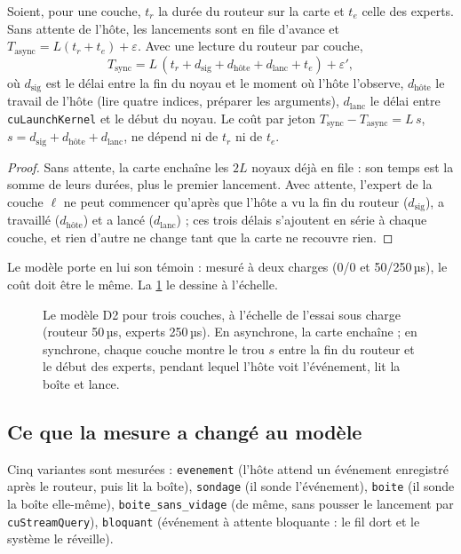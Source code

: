 \begin{proposition}\label{prop:t2c-d2}
Soient, pour une couche, $t_r$ la durée du routeur sur la carte et $t_e$ celle des experts. Sans attente de l'hôte, les lancements sont en file d'avance et $T_{\mathrm{async}} = L(t_r + t_e) + \varepsilon$. Avec une lecture du routeur par couche,
\[
T_{\mathrm{sync}} = L\,(t_r + d_{\mathrm{sig}} + d_{\text{hôte}} + d_{\mathrm{lanc}} + t_e) + \varepsilon',
\]
où $d_{\mathrm{sig}}$ est le délai entre la fin du noyau et le moment où l'hôte l'observe, $d_{\text{hôte}}$ le travail de l'hôte (lire quatre indices, préparer les arguments), $d_{\mathrm{lanc}}$ le délai entre \texttt{cuLaunchKernel} et le début du noyau. Le coût par jeton $T_{\mathrm{sync}} - T_{\mathrm{async}} = L\,s$, $s = d_{\mathrm{sig}} + d_{\text{hôte}} + d_{\mathrm{lanc}}$, ne dépend ni de $t_r$ ni de $t_e$.
\end{proposition}

\begin{proof}
Sans attente, la carte enchaîne les $2L$ noyaux déjà en file : son temps est la somme de leurs durées, plus le premier lancement. Avec attente, l'expert de la couche $\ell$ ne peut commencer qu'après que l'hôte a vu la fin du routeur ($d_{\mathrm{sig}}$), a travaillé ($d_{\text{hôte}}$) et a lancé ($d_{\mathrm{lanc}}$) ; ces trois délais s'ajoutent en série à chaque couche, et rien d'autre ne change tant que la carte ne recouvre rien.
\end{proof}

Le modèle porte en lui son témoin : mesuré à deux charges (0/0 et 50/250\,µs), le coût doit être le même. La \cref{fig:t2c-sync-modele} le dessine à l'échelle.

\begin{figure}[ht]
\centering
\SchemaChmSync
\caption[Le modèle D2, à l'échelle]{Le modèle D2 pour trois couches, à l'échelle de l'essai sous charge (routeur 50\,µs, experts 250\,µs). En asynchrone, la carte enchaîne ; en synchrone, chaque couche montre le trou $s$ entre la fin du routeur et le début des experts, pendant lequel l'hôte voit l'événement, lit la boîte et lance.}
\label{fig:t2c-sync-modele}
\end{figure}

\subsection{Ce que la mesure a changé au modèle}

Cinq variantes sont mesurées : \texttt{evenement} (l'hôte attend un événement enregistré après le routeur, puis lit la boîte), \texttt{sondage} (il sonde l'événement), \texttt{boite} (il sonde la boîte elle-même), \texttt{boite\_\allowbreak sans\_\allowbreak vidage} (de même, sans pousser le lancement par \texttt{cuStreamQuery}), \texttt{bloquant} (événement à attente bloquante : le fil dort et le système le réveille).

